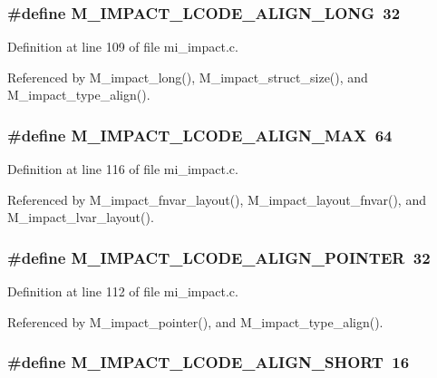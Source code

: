 \subsubsection{\setlength{\rightskip}{0pt plus 5cm}\#define M\_\-IMPACT\_\-LCODE\_\-ALIGN\_\-LONG~32}\label{mi__impact_8c_7642f0a647f1bfdba5c39b5a1a9224dc}




Definition at line 109 of file mi\_\-impact.c.

Referenced by M\_\-impact\_\-long(), M\_\-impact\_\-struct\_\-size(), and M\_\-impact\_\-type\_\-align().
\subsubsection{\setlength{\rightskip}{0pt plus 5cm}\#define M\_\-IMPACT\_\-LCODE\_\-ALIGN\_\-MAX~64}\label{mi__impact_8c_a7defd1f8384d84cc71303daccf66fb4}




Definition at line 116 of file mi\_\-impact.c.

Referenced by M\_\-impact\_\-fnvar\_\-layout(), M\_\-impact\_\-layout\_\-fnvar(), and M\_\-impact\_\-lvar\_\-layout().
\subsubsection{\setlength{\rightskip}{0pt plus 5cm}\#define M\_\-IMPACT\_\-LCODE\_\-ALIGN\_\-POINTER~32}\label{mi__impact_8c_2f6e08e7b90ce05dd1fc5d5105683562}




Definition at line 112 of file mi\_\-impact.c.

Referenced by M\_\-impact\_\-pointer(), and M\_\-impact\_\-type\_\-align().
\subsubsection{\setlength{\rightskip}{0pt plus 5cm}\#define M\_\-IMPACT\_\-LCODE\_\-ALIGN\_\-SHORT~16}\label{mi__impact_8c_ef720516dac29d6f5c8901bf9f3b23a4}





